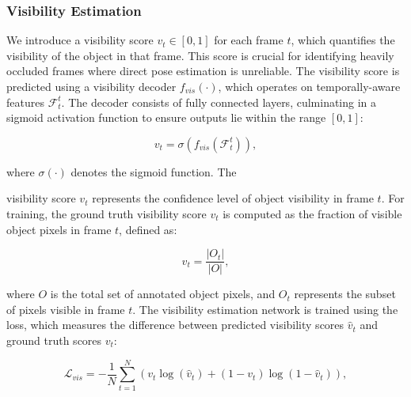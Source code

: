 \subsubsection{Visibility Estimation}

We introduce a visibility score $v_t \in [0, 1]$ for each frame $t$, which quantifies the visibility of the object in that frame. This score is crucial for identifying heavily occluded frames where direct pose estimation is unreliable. The visibility score is predicted using a visibility decoder $f_{vis}(\cdot)$, which operates on temporally-aware features $\mathcal{F}^t_t$. The decoder consists of fully connected layers, culminating in a sigmoid activation function to ensure outputs lie within the range $[0, 1]$:

\begin{equation}
v_t = \sigma(f_{vis}(\mathcal{F}^t_t)),
\end{equation}

\noindent where $\sigma(\cdot)$ denotes the sigmoid function. The \DIFaddbegin {}

\DIFaddend visibility score $v_t$ represents the confidence level of object visibility in frame $t$. For training, the ground truth visibility score $v_t$ is computed as the fraction of visible object pixels in frame $t$, defined as:

\begin{equation}
v_t = \frac{|O_t|}{|O|},
\end{equation}

\noindent where $O$ is the total set of annotated object pixels, and $O_t$ represents the subset of pixels visible in frame $t$. The visibility estimation network is trained using the \DIFdelbegin {}\DIFdelend \DIFaddbegin {}\DIFaddend loss, which measures the difference between predicted visibility scores $\hat{v}_t$ and ground truth scores $v_t$:

\begin{equation}
\mathcal{L}_{vis} = - \frac{1}{N} \sum_{t=1}^{N} \left( v_t \log(\hat{v}_t) + (1 - v_t) \log(1 - \hat{v}_t) \right),
\end{equation}

